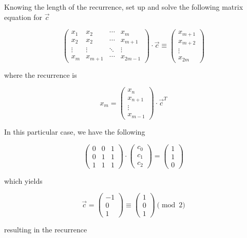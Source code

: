 \documentclass[12pt]{article}
\begin{document}
Knowing the length of the recurrence, set up and solve the following matrix equation for $\vec{c}$

$$\begin{pmatrix}x_1 & x_2 & \cdots & x_m \\ x_2 & x_2 & \cdots & x_{m+1} \\ \vdots & \vdots & \ddots & \vdots \\ x_m & x_{m+1} & \cdots & x_{2m - 1}\end{pmatrix} \cdot \vec{c} \equiv \begin{pmatrix}x_{m+1} \\ x_{m+2} \\ \vdots \\ x_{2m}\end{pmatrix}$$

where the recurrence is

$$x_m = \begin{pmatrix}x_{n} \\ x_{n + 1} \\ \vdots \\ x_{m - 1}\end{pmatrix} \cdot \vec{c}^T$$

In this particular case, we have the following

$$\begin{pmatrix}0 & 0 & 1 \\ 0 & 1 & 1 \\ 1 & 1 & 1\end{pmatrix}\cdot\begin{pmatrix}c_0 \\ c_1 \\ c_2\end{pmatrix} = \begin{pmatrix}1 \\ 1 \\ 0\end{pmatrix}$$

which yields

$$\vec{c} = \begin{pmatrix}-1 \\ 0 \\ 1\end{pmatrix} \equiv \begin{pmatrix}1 \\ 0 \\ 1\end{pmatrix} \pmod{2}$$

resulting in the recurrence
\end{document}
